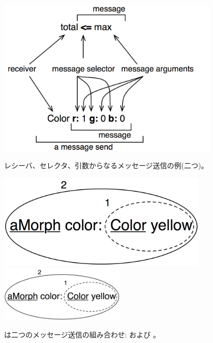 \documentclass[a4paper,10pt,twoside]{book}
\begin{document}
\begin{figure}[htb]
\begin{minipage}{0.53\textwidth}
	\begin{center}
	\includegraphics[width=0.95\textwidth]{message}
	\caption{レシーバ、セレクタ、引数からなるメッセージ送信の例(二つ)。}\end{center}
\end{minipage}
\hfill
\begin{minipage}{0.43\textwidth}
	\begin{center}
	\ifluluelse
		{\includegraphics[width=0.9\textwidth]{uKeyUnOne}}
		{\includegraphics[width=6cm]{uKeyUnOne}}
	\caption{ は二つのメッセージ送信の組み合わせ:  および 。}
	\end{center}
\end{minipage}
\end{figure}
\end{document}
